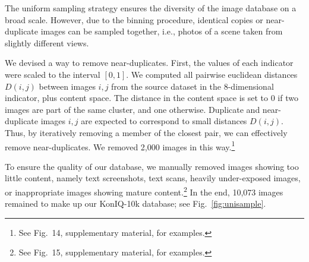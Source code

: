 \documentclass[10pt,journal,compsoc]{IEEEtran}
\begin{document}
The uniform sampling strategy ensures the diversity of the image database on a broad scale. However, due to the binning procedure, identical copies or near-duplicate images can be sampled together, i.e.,  photos of a scene taken from slightly different views. 



We devised a way to remove near-duplicates. First, the values of each indicator were scaled to the interval $[0,1]$. We computed all pairwise euclidean distances $D(i,j)$ between images $i,j$ from the source dataset in the 8-dimensional indicator, plus content space. The distance in the content space is set to 0 if two images are part of the same cluster, and one otherwise. Duplicate and near-duplicate images $i,j$ are expected to correspond to small distances $D(i,j)$. Thus, by iteratively removing a member of the closest pair, we can effectively remove near-duplicates. We removed 2,000 images in this way.\footnote{See Fig.~14, supplementary material, for examples.}







To ensure the quality of our database, we manually removed images showing too little content, namely text screenshots, text scans, heavily under-exposed images, or inappropriate images showing mature content.\footnote{See Fig.~15, supplementary material, for examples.}
In the end, 10,073 images remained to make up our KonIQ-10k database; see Fig.~\ref{fig:unisample}.
\end{document}
